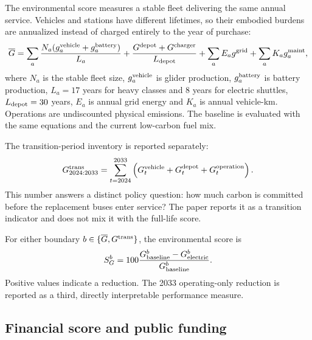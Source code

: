 \documentclass[12pt,letterpaper]{article}
\begin{document}
The environmental score measures a stable fleet delivering the same annual service. Vehicles and stations have different lifetimes, so their embodied burdens are annualized instead of charged entirely to the year of purchase:
\begin{equation}
\overline G=\sum_a \frac{N_a(g_a^{\rm vehicle}+g_a^{\rm battery})}{L_a}
+\frac{G^{\rm depot}+G^{\rm charger}}{L_{\rm depot}}
+\sum_a E_a g^{\rm grid}
+\sum_a K_a g_a^{\rm maint},
\end{equation}
where $N_a$ is the stable fleet size, $g_a^{\rm vehicle}$ is glider production, $g_a^{\rm battery}$ is battery production, $L_a=17$ years for heavy classes and 8 years for electric shuttles, $L_{\rm depot}=30$ years, $E_a$ is annual grid energy and $K_a$ is annual vehicle-km. Operations are undiscounted physical emissions. The baseline is evaluated with the same equations and the current low-carbon fuel mix.

The transition-period inventory is reported separately:
\begin{equation}
G^{\rm trans}_{2024:2033}=\sum_{t=2024}^{2033}\left(G^{\rm vehicle}_t+G^{\rm depot}_t+G^{\rm operation}_t\right).
\end{equation}
This number answers a distinct policy question: how much carbon is committed before the replacement buses enter service? The paper reports it as a transition indicator and does not mix it with the full-life score.

For either boundary $b\in\{\overline G,G^{\rm trans}\}$, the environmental score is
\begin{equation}
S_G^b=100\frac{G^b_{\rm baseline}-G^b_{\rm electric}}{G^b_{\rm baseline}}.
\end{equation}
Positive values indicate a reduction. The 2033 operating-only reduction is reported as a third, directly interpretable performance measure.

\subsection{Financial score and public funding}
\end{document}
